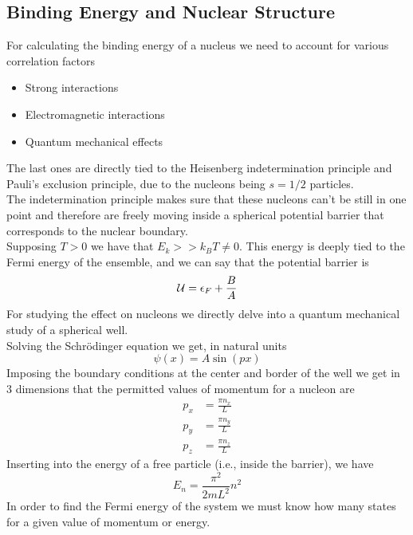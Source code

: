 \documentclass[../qm.tex]{subfiles}
\begin{document}
\subsection{Binding Energy and Nuclear Structure}
For calculating the binding energy of a nucleus we need to account for various correlation factors
\begin{itemize}
\item Strong interactions
\item Electromagnetic interactions
\item Quantum mechanical effects
\end{itemize}
The last ones are directly tied to the Heisenberg indetermination principle and Pauli's exclusion principle, due to the nucleons being $s=1/2$ particles.\\
The indetermination principle makes sure that these nucleons can't be still in one point and therefore are freely moving inside a spherical potential barrier that corresponds to the nuclear boundary.\\
Supposing $T>0$ we have that $E_k>>k_BT\ne0$. This energy is deeply tied to the Fermi energy of the ensemble, and we can say that the potential barrier is
\begin{equation*}
	\mathcal{U}=\epsilon_F+\frac{B}{A}
\end{equation*}
For studying the effect on nucleons we directly delve into a quantum mechanical study of a spherical well.\\
Solving the Schrödinger equation we get, in natural units
\begin{equation*}
	\psi(x)=A\sin(px)
\end{equation*}
Imposing the boundary conditions at the center and border of the well we get in 3 dimensions that the permitted values of momentum for a nucleon are
\begin{equation}
	\begin{aligned}
		p_x&=\frac{\pi n_x}{L}\\
		p_y&=\frac{\pi n_y}{L}\\
		p_z&=\frac{\pi n_z}{L}
	\end{aligned}
	\label{eq:permittedmomnuc}
\end{equation}
Inserting into the energy of a free particle (i.e., inside the barrier), we have
\begin{equation}
	E_n=\frac{\pi^2}{2mL^2}n^2
	\label{eq:energynucleus}
\end{equation}
In order to find the Fermi energy of the system we must know how many states for a given value of momentum or energy.\\
\end{document}
